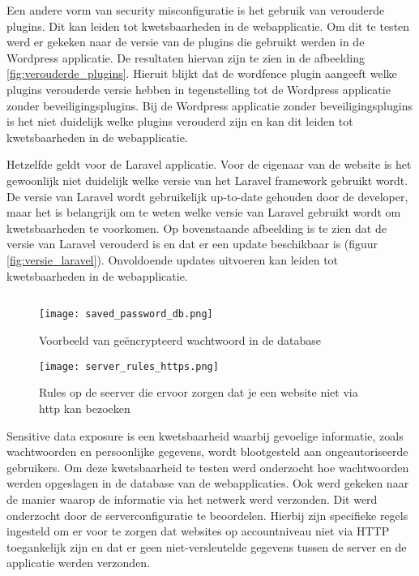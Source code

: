 Een andere vorm van security misconfiguratie is het gebruik van verouderde plugins. Dit kan leiden tot kwetsbaarheden in 
de webapplicatie. Om dit te testen werd er gekeken naar de versie van de plugins die gebruikt werden in de Wordpress 
applicatie. De resultaten hiervan zijn te zien in de afbeelding \ref{fig:verouderde_plugins}. Hieruit blijkt dat de wordfence 
plugin aangeeft welke plugins verouderde versie hebben in tegenstelling tot de Wordpress applicatie zonder beveiligingsplugins. 
Bij de Wordpress applicatie zonder beveiligingsplugins is het niet duidelijk welke plugins verouderd zijn en kan dit leiden 
tot kwetsbaarheden in de webapplicatie.

Hetzelfde geldt voor de Laravel applicatie. Voor de eigenaar van de website is het gewoonlijk niet duidelijk welke versie van 
het Laravel framework gebruikt wordt. De versie van Laravel wordt gebruikelijk up-to-date gehouden door de developer, maar het is 
belangrijk om te weten welke versie van Laravel gebruikt wordt om kwetsbaarheden te voorkomen. Op bovenstaande afbeelding is 
te zien dat de versie van Laravel verouderd is en dat er een update beschikbaar is (figuur \ref{fig:versie_laravel}). 
Onvoldoende updates uitvoeren kan leiden tot kwetsbaarheden in de webapplicatie. 


\subsection{}
\begin{figure}
    \centering
    \texttt{[image: saved\_password\_db.png]}
    \caption[Voorbeeld van geëncrypteerd wachtwoord in de database]{Voorbeeld van geëncrypteerd wachtwoord in de database}
    \label{fig:saved_password_db}
\end{figure}
\begin{figure}
    \centering
    \texttt{[image: server\_rules\_https.png]}
    \caption[Rules op de seerver die ervoor zorgen dat je een website niet via http kan bezoeken]{Rules op de seerver die ervoor zorgen dat je een website niet via http kan bezoeken}
    \label{fig:server_rules}
\end{figure}
Sensitive data exposure is een kwetsbaarheid waarbij gevoelige informatie, zoals wachtwoorden en persoonlijke gegevens, wordt 
blootgesteld aan ongeautoriseerde gebruikers. Om deze kwetsbaarheid te testen werd onderzocht hoe wachtwoorden werden 
opgeslagen in de database van de webapplicaties. Ook werd gekeken naar de manier waarop de informatie via het netwerk werd 
verzonden. Dit werd onderzocht door de serverconfiguratie te beoordelen. Hierbij zijn specifieke regels ingesteld om er voor 
te zorgen dat websites op accountniveau niet via HTTP toegankelijk zijn en dat er geen niet-versleutelde gegevens tussen de 
server en de applicatie werden verzonden.

